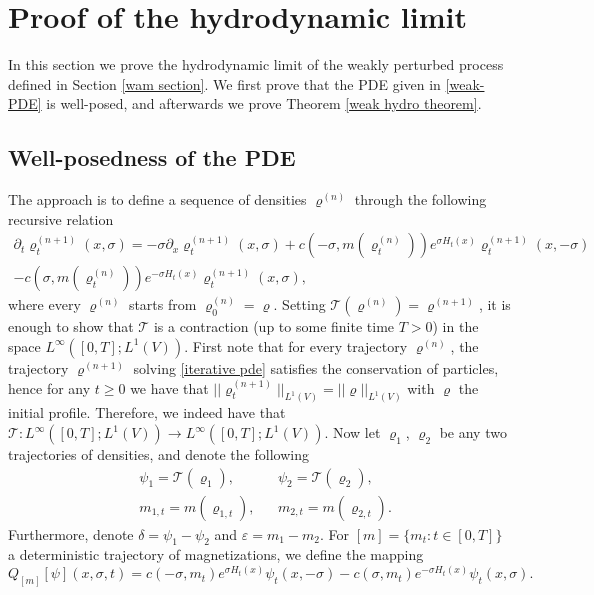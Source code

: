 \documentclass[11pt]{article}
\numberwithin{equation}{section}
\theoremstyle{definition}
\theoremstyle{plain}
\begin{document}
\section{Proof of the hydrodynamic limit}\label{proof hydro}
In this section we prove the hydrodynamic limit of the weakly perturbed process defined in Section \ref{wam section}. We first prove that the PDE given in \eqref{weak-PDE} is well-posed, and afterwards we prove Theorem \eqref{weak hydro theorem}.
\subsection{Well-posedness of the PDE}
The approach is to define a sequence of densities $\varrho^{(n)}$ through the following recursive relation
\begin{multline}\label{iterative pde}
        \partial_t \varrho^{(n+1)}_t(x,\sigma) = -\sigma \partial_x\varrho^{(n+1)}_t(x,\sigma) + c(-\sigma,m(\varrho^{(n)}_t))e^{\sigma H_t(x)}\varrho^{(n+1)}_t(x,-\sigma)\\ - c(\sigma,m(\varrho^{(n)}_t))e^{-\sigma H_t(x)}\varrho^{(n+1)}_t(x,\sigma),
\end{multline}
where every $\varrho^{(n)}$ starts from $\varrho^{(n)}_0 = \varrho$. 
Setting $\mathcal{T}(\varrho^{(n)}) = \varrho^{(n+1)}$, it is enough to show that $\mathcal{T}$ is a contraction (up to some  finite time $T>0$) in the space $L^{\infty}([0,T];L^1(V))$. First note that for every trajectory $\varrho^{(n)}$, the trajectory $\varrho^{(n+1)}$ solving \eqref{iterative pde} satisfies the conservation of particles, hence for any $t\geq0$ we have that $||\varrho^{(n+1)}_t||_{L^1(V)} = ||\varrho||_{L^1(V)}$ with $\varrho$ the initial profile. Therefore, we indeed have that $\mathcal{T}: L^{\infty}([0,T];L^1(V))\to L^{\infty}([0,T];L^1(V))$. Now let $\varrho_1$, $\varrho_2$ be any two trajectories of densities, and denote the following 
\begin{align}
    &\nonumber\psi_1 = \mathcal{T}(\varrho_1), && \psi_2= \mathcal{T}(\varrho_2),\\
    &m_{1,t} = m(\varrho_{1,t}), &&m_{2,t} = m(\varrho_{2,t}).
\end{align}
Furthermore, denote $\delta = \psi_1 - \psi_2$ and $\varepsilon = m_1 - m_2$. For $[m]=\{m_t:t\in[0,T]\}$ a deterministic trajectory of magnetizations, we define the mapping 
\begin{equation}
    Q_{[m]}[\psi](x,\sigma,t) = c(-\sigma,m_t)e^{\sigma H_t(x)}\psi_t(x,-\sigma) - c(\sigma,m_t)e^{-\sigma H_t(x)}\psi_t(x,\sigma).
\end{equation}
\end{document}
